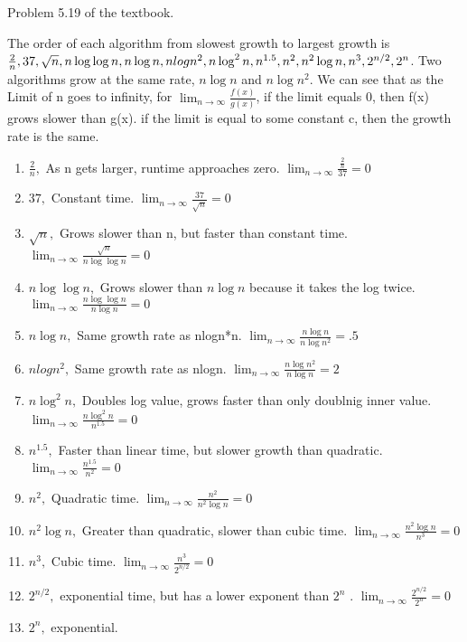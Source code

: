 \documentclass[10pt]{article}
\newenvironment{exercise}[2][Exercise]{\begin{trivlist}
\item[\hskip \labelsep {\bfseries #1}\hskip \labelsep {\bfseries #2.}]}{\end{trivlist}}
\newenvironment{solution}[2][Solution]{\begin{trivlist}
\item[\hskip \labelsep {\bfseries #1}\hskip \labelsep {\bfseries #2.}]}{\end{trivlist}}
\theoremstyle{definition}
\begin{document}
\begin{exercise}{(3a)} 
Problem 5.19 of the textbook.
\end{exercise}

\begin{solution}{(3a)}
The order of each algorithm from slowest growth to largest growth is $\frac{2}{n}, 37, \sqrt n, n \log \log n, \\
n \log n, n log n^2, n \log^2 n, n^{1.5}, n^2, n^2 \log n, n^3, 2^{n/2}, 2^n$. Two algorithms grow at the same rate, $n\log n$ and $n \log n^2$. 
We can see that as the Limit of n goes to infinity, for $\lim_{n\to\infty} \frac {f(x)}{g(x)}$, if the limit equals 0, then f(x) grows slower than g(x). if the limit is equal to some constant
c, then the growth rate is the same.
\end{solution}

\begin{enumerate}
  \item $\frac{2}{n},$ As n gets larger, runtime approaches zero. $\lim_{n\to\infty} \frac {\frac{2}{n}}{37} = 0$
  \item $37,$ Constant time. $\lim_{n\to\infty} \frac {37}{\sqrt n} = 0$
  \item $\sqrt n,$ Grows slower than n, but faster than constant time. $\lim_{n\to\infty} \frac {\sqrt n}{n \log \log n} = 0$
  \item $n \log \log n,$ Grows slower than $n \log n$ because it takes the log twice. $\lim_{n\to\infty} \frac {n \log \log n}{n \log n} = 0$
  \item $n \log n,$ Same growth rate as nlogn*n. $\lim_{n\to\infty} \frac {n \log n}{n \log n^2} = .5$
  \item $n log n^2,$ Same growth rate as nlogn. $\lim_{n\to\infty} \frac {n \log n^2}{n \log n} = 2$
  \item $n \log^2 n,$ Doubles log value, grows faster than only doublnig inner value. $\lim_{n\to\infty} \frac {n \log^2 n}{n^{1.5}} = 0$
  \item $n^{1.5},$ Faster than linear time, but slower growth than quadratic. $\lim_{n\to\infty} \frac {n^{1.5}}{n^2} = 0$
  \item $n^2,$ Quadratic time. $\lim_{n\to\infty} \frac {n^2}{n^2 \log n} = 0$
  \item $n^2 \log n,$ Greater than quadratic, slower than cubic time. $\lim_{n\to\infty} \frac {n^2 \log n}{n^3} = 0$
  \item $n^3,$ Cubic time. $\lim_{n\to\infty} \frac {n^3}{2^{n/2}} = 0$
  \item $2^{n/2},$ exponential time, but has a lower exponent than $2^n$ . $\lim_{n\to\infty} \frac {2^{n/2}}{2^n} = 0$
  \item $2^n,$ exponential.
\end{enumerate}
\end{document}
